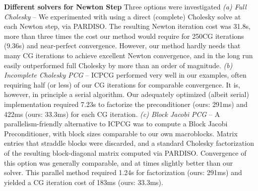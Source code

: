 \noindent\textbf{Different solvers for Newton Step} Three options were
investigated \emph{(a) Full Cholesky} -- We experimented with using a
direct (complete) Cholesky solve at each Newton step, via PARDISO. The
resulting Newton iteration cost was 31.8s, more than three times the
cost our method would require for 250CG iterations (9.36s) and
near-perfect convergence. However, our method hardly needs that many
CG iterations to achieve excellent Newton convergence, and in the long
run easily outperformed full Cholesky by more than an order of
magnitude. \emph{(b) Incomplete Cholesky PCG} -- ICPCG performed very
well in our examples, often requiring half (or less) of our CG
iterations for comparable convergence. It is, however, in principle a
serial algorithm. Our adequately optimized (albeit serial)
implementation required 7.23s to factorize the preconditioner (ours:
291ms) and 422ms (ours: 33.3ms) for each CG iteration. \emph{(c) Block
  Jacobi PCG} -- A parallelism-friendly alternative to ICPCG was to
compute a Block Jacobi Preconditioner, with block sizes comparable to
our own macroblocks. Matrix entries that straddle blocks were
discarded, and a standard Cholesky factorization of the resulting
block-diagonal matrix computed via PARDISO. Convergence of this option
was generally comparable, and at times slightly better than our
solver. This parallel method required 1.24s for factorization (ours:
291ms) and yielded a CG iteration cost of 183ms (ours: 33.3ms). 


